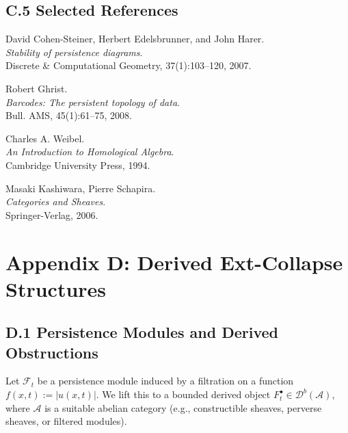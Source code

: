 \documentclass[11pt]{article}
\begin{document}
\subsection*{C.5 Selected References}

\begin{thebibliography}{9}

David Cohen-Steiner, Herbert Edelsbrunner, and John Harer.\\
\textit{Stability of persistence diagrams}.\\
Discrete \& Computational Geometry, 37(1):103--120, 2007.

Robert Ghrist.\\
\textit{Barcodes: The persistent topology of data}.\\
Bull. AMS, 45(1):61--75, 2008.

Charles A. Weibel.\\
\textit{An Introduction to Homological Algebra}.\\
Cambridge University Press, 1994.

Masaki Kashiwara, Pierre Schapira.\\
\textit{Categories and Sheaves}.\\
Springer-Verlag, 2006.

\end{thebibliography}



\section*{Appendix D: Derived Ext-Collapse Structures}

\subsection*{D.1 Persistence Modules and Derived Obstructions}

Let $\mathcal{F}_t$ be a persistence module induced by a filtration on a function $f(x,t) := |u(x,t)|$.  
We lift this to a bounded derived object $F_t^\bullet \in \mathcal{D}^b(\mathcal{A})$, where $\mathcal{A}$ is a suitable abelian category (e.g., constructible sheaves, perverse sheaves, or filtered modules).
\end{document}
